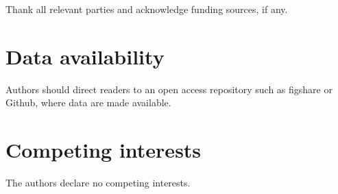\documentclass[breakmath,report,languages={french,japanese,arabic}]{seismica}
\begin{document}
\begin{acknowledgements}
	Thank all relevant parties and acknowledge funding sources, if any.
\end{acknowledgements}
	
\section*{Data availability}
Authors should direct readers to an open access repository such as figshare or Github, where data are made available.

\section*{Competing interests}
The authors declare no competing interests.

 
	
\end{document}
